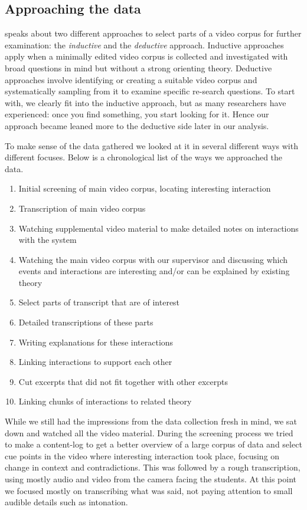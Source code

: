 \subsection{Approaching the data}
\citet{derry2010conducting} speaks about two different approaches to select parts of a video corpus for further examination: the \emph{inductive} and the \emph{deductive} approach. Inductive approaches apply when a minimally edited video corpus is collected and investigated with broad questions in mind but without a strong orienting theory. Deductive approaches involve identifying or creating a suitable video corpus and systematically sampling from it to examine specific re-search questions. \citep{derry2010conducting} To start with, we clearly fit into the inductive approach, but as many researchers have experienced: once you find something, you start looking for it. Hence our approach became leaned more to the deductive side later in our analysis.

To make sense of the data gathered we looked at it in several different ways with different focuses. Below is a chronological list of the ways we approached the data. 

\begin{enumerate}
\item{Initial screening of main video corpus, locating interesting interaction}
\item{Transcription of main video corpus}
\item{Watching supplemental video material to make detailed notes on interactions with the system}
\item{Watching the main video corpus with our supervisor and discussing which events and interactions are interesting and/or can be explained by existing theory}
\item{Select parts of transcript that are of interest}
\item{Detailed transcriptions of these parts}
\item{Writing explanations for these interactions}
\item{Linking interactions to support each other}
\item{Cut excerpts that did not fit together with other excerpts}
\item{Linking chunks of interactions to related theory}
\end{enumerate}

While we still had the impressions from the data collection fresh in mind, we sat down and watched all the video material. During the screening process we tried to make a content-log to get a better overview of a large corpus of data and select cue points in the video where interesting interaction took place, focusing on change in context and contradictions. This was followed by a rough transcription, using mostly audio and video from the camera facing the students. At this point we focused mostly on transcribing what was said, not paying attention to small audible details such as intonation. 

